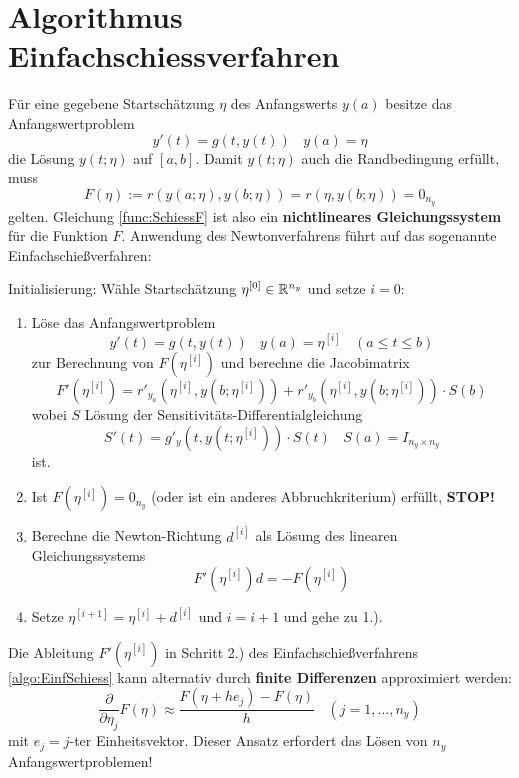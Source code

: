 \section{Algorithmus Einfachschiessverfahren}
Für eine gegebene Startschätzung $\eta$ des Anfangswerts $y(a)$ besitze das Anfangswertproblem
\[y'(t) = g(t, y(t)) \ \ \ \ y(a) = \eta\]
die Lösung $y(t;\eta)$ auf $[a,b]$. Damit $y(t;\eta)$ auch die Randbedingung erfüllt, muss 
\begin{equation}\label{func:SchiessF}
F(\eta) := r(y(a;\eta), y(b;\eta)) = r(\eta, y(b;\eta)) = 0_{n_y}
\end{equation}
gelten. Gleichung \ref{func:SchiessF} ist also ein \textbf{nichtlineares Gleichungssystem} für die Funktion $F$. Anwendung des Newtonverfahrens führt auf das sogenannte Einfachschießverfahren:

\begin{definition}\label{algo:EinfSchiess}
Initialisierung: Wähle Startschätzung $\eta^{[0]} \in \mathbb{R}^{n_y}$ und setze $i = 0$:
\begin{enumerate}
\item Löse das Anfangswertproblem \[y'(t) = g(t, y(t)) \ \ \ \ y(a) = \eta^{[i]} \ \ \ \ (a \leq t \leq b)\] zur Berechnung von $F(\eta^{[i]})$ und berechne die Jacobimatrix \[F'(\eta^{[i]}) = r'_{y_a} (\eta^{[i]}, y(b;\eta^{[i]})) + r'_{y_b}(\eta^{[i]}, y(b;\eta^{[i]})) \cdot S(b)\] wobei $S$ Lösung der Sensitivitäts-Differentialgleichung \[S'(t) = g'_y(t, y(t;\eta^{[i]})) \cdot S(t) \ \ \ \ S(a) = I_{n_y \times n_y}\] ist.
%
\item Ist $F(\eta^{[i]}) = 0_{n_y}$ (oder ist ein anderes Abbruchkriterium) erfüllt, \textbf{STOP!}
%
\item Berechne die Newton-Richtung $d^{[i]}$ als Lösung des linearen Gleichungssystems \[F'(\eta^{[i]})d = -F(\eta^{[i]})\]
%
\item Setze $\eta^{[i+1]} = \eta^{[i]} + d^{[i]}$ und $i=i+1$ und gehe zu 1.).
\end{enumerate}
\end{definition}

Die Ableitung $F'(\eta^{[i]})$ in Schritt 2.) des Einfachschießverfahrens \ref{algo:EinfSchiess} kann alternativ
durch \textbf{finite Differenzen} approximiert werden:
\[\dfrac{\partial}{\partial \eta_j} F(\eta) \approx \dfrac{F(\eta + h e_j) - F(\eta)}{h} \ \ \ \ (j=1,...,n_y)\]
mit $e_j = j$-ter Einheitsvektor. Dieser Ansatz erfordert das Lösen von $n_y$ Anfangswertproblemen!


